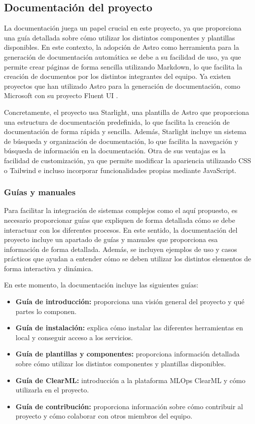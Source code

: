 \subsection{Documentación del proyecto}
La documentación juega un papel crucial en este proyecto, ya 
que proporciona una guía detallada sobre cómo utilizar los distintos 
componentes y plantillas disponibles. En este contexto, la adopción 
de Astro \cite{Astro} como herramienta para la generación de documentación
automática se debe a su facilidad de uso, ya que permite crear
páginas de forma sencilla utilizando Markdown, lo que facilita la
creación de documentos por los distintos integrantes del equipo.
Ya existen proyectos que han utilizado Astro para la generación
de documentación, como Microsoft con su proyecto Fluent UI 
\cite{astroPagesHalf}.\medskip

Concretamente, el proyecto usa Starlight, una plantilla de Astro que
proporciona una estructura de documentación predefinida, lo que
facilita la creación de documentación de forma rápida y sencilla.
Además, Starlight incluye un sistema de búsqueda y organización
de documentación, lo que facilita la navegación y búsqueda de
información en la documentación. Otra de sus ventajas es la
facilidad de customización, ya que permite modificar la apariencia
utilizando CSS o Tailwind e incluso incorporar funcionalidades
propias mediante JavaScript.

\subsubsection{Guías y manuales}
Para facilitar la integración de sistemas complejos como el aquí
propuesto, es necesario proporcionar guías que expliquen
de forma detallada cómo se debe interactuar con los diferentes
procesos. En este sentido, la documentación del proyecto incluye
un apartado de guías y manuales que proporciona esa información
de forma detallada. Además, se incluyen ejemplos de uso y casos
prácticos que ayudan a entender cómo se deben utilizar los distintos
elementos de forma interactiva y dinámica.\medskip

En este momento, la documentación incluye las siguientes guías:
\begin{itemize}
    \item \textbf{Guía de introducción:} proporciona una visión general del
    proyecto y qué partes lo componen.
    \item \textbf{Guía de instalación:} explica cómo instalar las diferentes 
    herramientas en local y conseguir acceso a los servicios. 
    \item \textbf{Guía de plantillas y componentes:} proporciona información detallada sobre cómo
    utilizar los distintos componentes y plantillas disponibles.
    \item \textbf{Guía de ClearML:} introducción a la plataforma MLOps ClearML y cómo
    utilizarla en el proyecto.
    \item \textbf{Guía de contribución:} proporciona información sobre cómo
    contribuir al proyecto y cómo colaborar con otros miembros del
    equipo.
\end{itemize}

